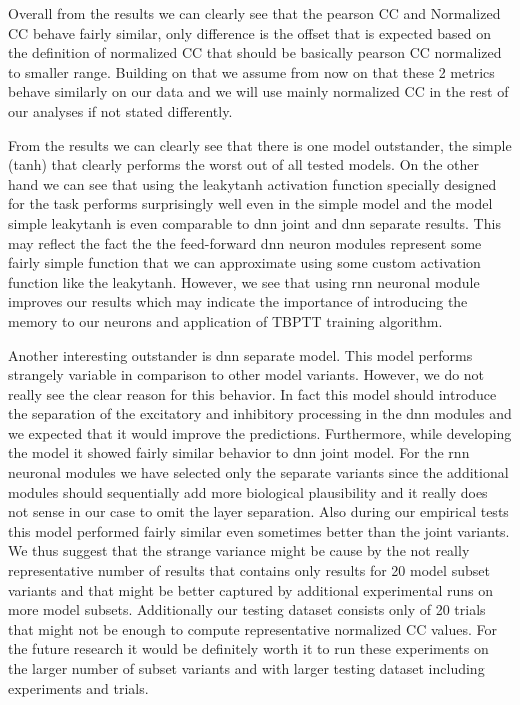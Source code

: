 Overall from the results we can clearly see that the pearson CC and Normalized CC behave fairly similar, only difference is the offset that is expected based on the definition of normalized CC that should be basically pearson CC normalized to smaller range. Building on that we assume from now on that these 2 metrics behave similarly on our data and we will use mainly normalized CC in the rest of our analyses if not stated differently.

From the results we can clearly see that there is one model outstander, the simple (tanh) that clearly performs the worst out of all tested models. On the other hand we can see that using the leakytanh activation function specially designed for the task performs surprisingly well even in the simple model and the model simple leakytanh is even comparable to dnn joint and dnn separate results. This may reflect the fact the the feed-forward dnn neuron modules represent some fairly simple function that we can approximate using some custom activation function like the leakytanh. However, we see that using rnn neuronal module improves our results which may indicate the importance of introducing the memory to our neurons and application of TBPTT training algorithm. 

Another interesting outstander is dnn separate model. This model performs strangely variable in comparison to other model variants. However, we do not really see the clear reason for this behavior. In fact this model should introduce the separation of the excitatory and inhibitory processing in the dnn modules and we expected that it would improve the predictions. Furthermore, while developing the model it showed fairly similar behavior to dnn joint model. For the rnn neuronal modules we have selected only the separate variants since the additional modules should sequentially add more biological plausibility and it really does not sense in our case to omit the layer separation. Also during our empirical tests this model performed fairly similar even sometimes better than the joint variants. We thus suggest that the strange variance might be cause by the not really representative number of results that contains only results for 20 model subset variants and that might be better captured by additional experimental runs on more model subsets. Additionally our testing dataset consists only of 20 trials that might not be enough to compute representative normalized CC values. For the future research it would be definitely worth it to run these experiments on the larger number of subset variants and with larger testing dataset including experiments and trials.

